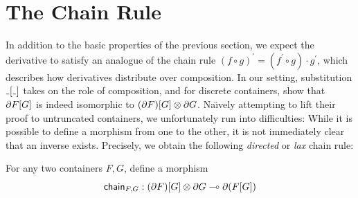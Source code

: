 \section{The Chain Rule}\label{chain-rule}

In addition to the basic properties of the previous section,
we expect the derivative to satisfy an analogue of the chain rule
\( (f \circ g)^{\prime} = (f^{\prime} \circ g) \cdot g^{\prime} \),
which describes how derivatives distribute over composition.
In our setting, substitution \( \Subst{\Blank}{\Blank} \) takes on the role of composition,
and for discrete containers, \citeauthor{AbbottEtAl2005DataDifferentiating} show that
\( \partial{F\lbrack G\rbrack} \) is indeed isomorphic to \( (\partial{F})\lbrack G\rbrack \mathbin{\otimes} \partial{G} \).
Na{\"\i}vely attempting to lift their proof to untruncated containers,
we unfortunately run into difficulties:
While it is possible to define a morphism from one to the other,
it is not immediately clear that an inverse exists.
Precisely, we obtain the following \emph{directed} or \emph{lax} chain rule:
\begin{problem}[note={The lax chain rule}]\label{lax-chain-rule}
  For any two containers \( F, G \), define a morphism
  \[
    \Chain_{F,G} :
    \Cart%
      { \Subst{(\Der{F})}{G} \CTimes \Der{G} }%
      {\Der{(\Subst{F}{G})}}
  \]
\end{problem}

